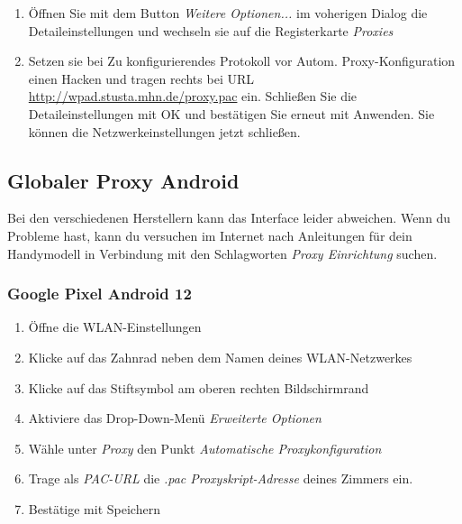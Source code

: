 \documentclass[a4paper,12pt]{scrartcl}
\begin{document}
\begin{enumerate}
	\item Öffnen Sie mit dem Button \emph{Weitere Optionen...} im voherigen Dialog die Detaileinstellungen und wechseln sie auf die Registerkarte \emph{Proxies}
	\item Setzen sie bei Zu konfigurierendes Protokoll vor Autom. Proxy-Konfiguration einen Hacken und tragen rechts bei URL \url{http://wpad.stusta.mhn.de/proxy.pac} ein. Schließen Sie die Detaileinstellungen mit OK und bestätigen Sie erneut mit Anwenden. Sie können die Netzwerkeinstellungen jetzt schließen.
\end{enumerate}

\subsection{Globaler Proxy Android}
Bei den verschiedenen Herstellern kann das Interface leider abweichen.
Wenn du Probleme hast, kann du versuchen im Internet nach Anleitungen für dein Handymodell in Verbindung mit den Schlagworten \textit{Proxy Einrichtung} suchen.

\subsubsection*{Google Pixel Android 12}
\begin{enumerate}
	\item Öffne die WLAN-Einstellungen
	\item Klicke auf das Zahnrad neben dem Namen deines WLAN-Netzwerkes
	\item Klicke auf das Stiftsymbol am oberen rechten Bildschirmrand
	\item Aktiviere das Drop-Down-Menü \textit{Erweiterte Optionen}
	\item Wähle unter \textit{Proxy} den Punkt \textit{Automatische Proxykonfiguration}
	\item Trage als \textit{PAC-URL} die \textit{.pac Proxyskript-Adresse} deines Zimmers ein.
	\item Bestätige mit Speichern
\end{enumerate}
\end{document}
